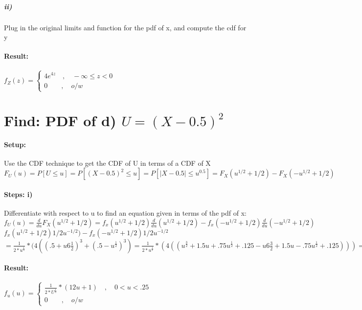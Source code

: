\subparagraph{ii)} Plug in the original limits and function for the pdf of x, and compute the cdf for y

\paragraph{Result:} ${ f }_{ Z }(z)=\begin{cases} { 4e }^{4z} \quad ,\quad -\infty\le{z}<0 \\ 0\quad  \quad ,\quad o/w \end{cases}$

\section*{Find: PDF of d) $U={ (X-0.5) }^{ 2 }$}

\paragraph{Setup:} Use the CDF technique to get the CDF of U in terms of a CDF of X\\${ F }_{ U }(u)=P[U\le u]=P[{ (X-0.5) }^{ 2 }\le u]=P[ \left| X-0.5 \right| \le { u }^{ 0.5 } ]={ F }_{ X }({u}^{1/2}+1/2)-{ F }_{ X }({-u}^{1/2}+1/2)$

\paragraph{Steps: i)} Differentiate with respect to u to find an equation given in terms of the pdf of x:\\ ${ f }_{ U }(u)=\frac { d }{ du } { F }_{ X }({u}^{1/2}+1/2)={ f }_{ x }({u}^{1/2}+1/2)\frac{ d }{ du }({u}^{1/2}+1/2)-{ f }_{ x }({-u}^{1/2}+1/2)\frac{ d }{ du }({-u}^{1/2}+1/2)$\\${ f }_{ x }({u}^{1/2}+1/2)1/2{u}^{-1/2})-{ f }_{ x }({-u}^{1/2}+1/2)1/2{u}^{-1/2}$\\$=\frac{1}{2*u^\frac{1}{2}}*(4((.5+u6\frac{1}{2})^3+(.5-u^\frac{1}{2})^3)=\frac{1}{2*u^\frac{1}{2}}*(4((u^\frac{3}{2}+1.5u+.75u^\frac{1}{2}+.125-u6\frac{3}{2}+1.5u-.75u^\frac{1}{2}+.125)))=\frac{1}{2*u^\frac{1}{2}}*(4(3u+.25)$




\paragraph{Result:} ${ f }_{ u }(u)=\begin{cases} {\frac{1}{2*U^\frac{1}{2}}*(12u+1)  } \quad ,\quad 0<{u}<.25 \\ 0\quad  \quad ,\quad o/w \end{cases}$

